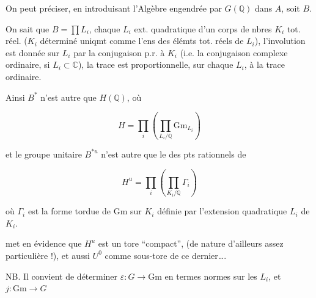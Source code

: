On peut préciser, en introduisant l'Algèbre engendrée par  $G(\mathbb Q)$ dans $A$, soit $B$.

On sait que $B=\prod L_i$, chaque $L_i$ ext. quadratique d'un corps de nbres $K_i$ tot. réel. ($K_i$ déterminé uniqmt   comme l'ens des élémts tot. réels de $L_i$), l'involution est donnée sur $L_i$ par la conjugaison p.r. à $K_i$ (i.e. la conjugaison complexe ordinaire, si $L_i\subset\mathbb C$), la trace est proportionnelle, sur chaque $L_i$, à la trace ordinaire.

Ainsi $B^*$ n'est autre que $H(\mathbb Q)$, où

\[
H=\prod_i\left(\prod_{L_i/\mathbb Q}\mathrm{Gm}_{L_i}\right)
\]

et le groupe unitaire $B^{*u}$ n'est autre que le  des pts rationnels de

\[
H^u=\prod_i\left(\prod_{K_i/\mathbb Q}\Gamma_i\right)
\]

où $\Gamma_i$ est la forme tordue de $\mathrm{Gm}$ sur $K_i$ définie par l'extension quadratique $L_i$ de $K_i$.

\deleted{[}   met en évidence que $H^u$ est un tore ``compact'',  (de nature d'ailleurs assez particulière !), et aussi $U^0$ comme sous-tore de ce dernier\ldots.

NB. Il convient de déterminer $\varepsilon:G\longrightarrow\mathrm{Gm}$ en termes    normes sur les $L_i$, et $j:\mathrm{Gm}\longrightarrow G$ \margin{$=\ldots$}

